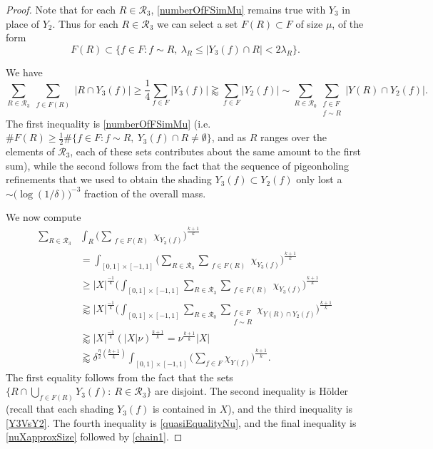 \documentclass[letterpaper, reqno,11pt]{article}
\numberwithin{equation}{section}
\numberwithin{thm}{section}
\theoremstyle{remark}
\begin{document}
\begin{proof}
Note that for each $R\in\mathcal{R}_3$, \eqref{numberOfFSimMu} remains true with $Y_3$ in place of $Y_2$. Thus for each $R\in\mathcal{R}_3$ we can select a set $F(R)\subset F$ of size $\mu$, of the form 
\begin{equation}\label{defnFR}
F(R) \subset \{f\in F\colon f\sim R,\ \lambda_R \leq |Y_3(f)\cap R| < 2\lambda_R\}.
\end{equation}


\medskip

\noindent We have
\begin{equation}\label{Y3VsY2}
\sum_{R\in\mathcal{R}_3} \sum_{\substack{f\in F(R)}}|R\cap Y_3(f)| \geq \frac{1}{4}  \sum_{f\in F}|Y_3(f)| \gtrapprox \sum_{f\in F}|Y_2(f)| \sim 
\sum_{R\in\mathcal{R}_0}\sum_{\substack{f\in F \\ f\sim R}}|Y(R)\cap Y_2(f)|.
\end{equation}
The first inequality is \eqref{numberOfFSimMu} (i.e. $\#F(R)\geq \frac{1}{2}\#\{f\in F\colon f\sim R,\ Y_3(f)\cap R\neq\emptyset\}$, and as $R$ ranges over the elements of $\mathcal{R}_3$,  each of these sets contributes about the same amount to the first sum), while the second follows from the fact that the sequence of pigeonholing refinements that we used to obtain the shading $Y_3(f)\subset Y_2(f)$ only lost a $\sim \big(\log(1/\delta)\big)^{-3}$ fraction of the overall mass.



We now compute
\begin{equation}\label{Y3VsOriginalY}
\begin{split}
\sum_{R\in\mathcal{R}_3}& \int_{R}\Big(\sum_{\substack{f\in F(R)}}\chi_{Y_3(f)}\Big)^{\frac{k+1}{k}}\\
& = \int_{[0,1]\times[-1,1]}\Big(\sum_{R\in\mathcal{R}_3}\sum_{\substack{f\in F(R)}}\chi_{Y_3(f)}\Big)^{\frac{k+1}{k}}\\
& \geq |X|^{\frac{-1}{k}}\Big(\int_{[0,1]\times[-1,1]}\sum_{R\in\mathcal{R}_3}\sum_{\substack{f\in F(R)}}\chi_{Y_3(f)}\Big)^{\frac{k+1}{k}}\\
& \gtrapprox |X|^{\frac{-1}{k}}\Big(\int_{[0,1]\times[-1,1]}\sum_{R\in\mathcal{R}_0}\sum_{\substack{f\in F \\ f\sim R}}\chi_{Y(R)\cap Y_2(f)}\Big)^{\frac{k+1}{k}}\\
& \gtrapprox |X|^{\frac{-1}{k}}(|X| \nu) ^{\frac{k+1}{k}} = \nu^{\frac{k+1}{k}}|X|\\
& \gtrapprox \delta^{\frac{\eta}{2}(\frac{k+1}{k})}\int_{[0,1]\times[-1,1]}\Big(\sum_{f\in F}\chi_{Y(f)}\Big)^{\frac{k+1}{k}}.
\end{split}
\end{equation}
The first equality follows from the fact that the sets $\{R\cap \bigcup_{f\in F(R)}Y_3(f):\ R\in\mathcal{R}_3\}$ are disjoint. The second inequality is H\"older (recall that each shading $Y_3(f)$ is contained in $X$), and the third inequality is \eqref{Y3VsY2}. The fourth inequality is \eqref{quasiEqualityNu}, and the final inequality is \eqref{nuXapproxSize} followed by \eqref{chain1}.





\end{proof}
\end{document}
